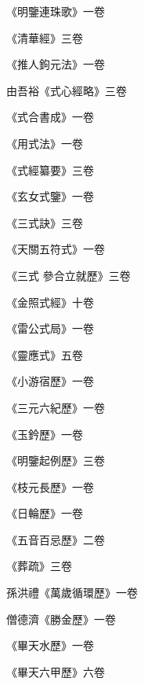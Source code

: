 \begin{pinyinscope}
 《明鑒連珠歌》一卷



 《清華經》三卷



 《推人鉤元法》一卷



 由吾裕《式心經略》三卷



 《式合書成》一卷



 《用式法》一卷



 《式經纂要》三卷



 《玄女式鑒》一卷



 《三式訣》三卷



 《天關五符式》一卷



 《三式
 參合立就歷》三卷



 《金照式經》十卷



 《雷公式局》一卷



 《靈應式》五卷



 《小游宿歷》一卷



 《三元六紀歷》一卷



 《玉鈐歷》一卷



 《明鑒起例歷》三卷



 《枝元長歷》一卷



 《日輪歷》一卷



 《五音百忌歷》二卷



 《葬疏》三卷



 孫洪禮《萬歲循環歷》一卷



 僧德濟《勝金歷》一卷



 《畢天水歷》一卷



 《畢天六甲歷》六卷




\end{pinyinscope}

